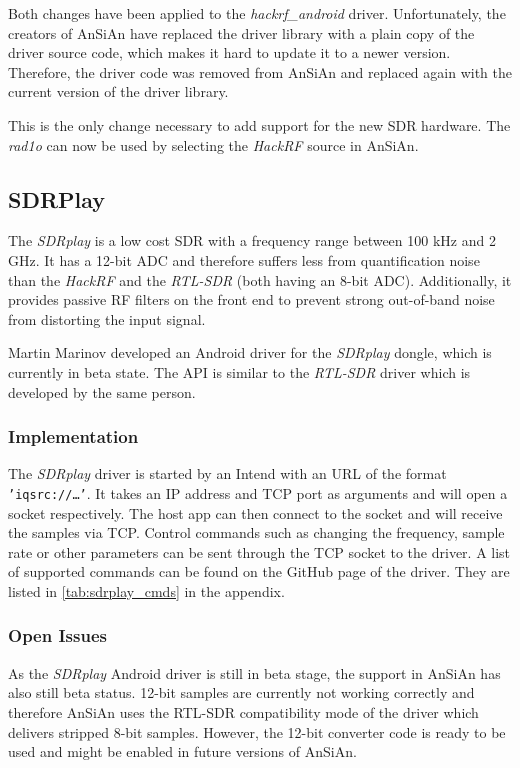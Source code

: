 Both changes have been applied to the \emph{hackrf\_android} driver. Unfortunately, the
creators of \ac{AnSiAn} have replaced the driver library with a plain copy of the driver
source code, which makes it hard to update it to a newer version. Therefore, the
driver code was removed from \ac{AnSiAn} and replaced again with the current version
of the driver library.

This is the only change necessary to add support for the new \ac{SDR} hardware. 
The \emph{rad1o} can now be used by selecting the \emph{HackRF} source in \ac{AnSiAn}.


\subsection{SDRPlay}

The \emph{SDRplay} is a low cost \ac{SDR} with a frequency range between 100 kHz and
2 GHz. It has a 12-bit \ac{ADC} and therefore suffers less from quantification noise
than the \emph{HackRF} and the \emph{RTL-SDR} (both having an 8-bit \ac{ADC}).
Additionally, it provides passive \ac{RF} filters on the front end to prevent strong
out-of-band noise from distorting the input signal.

Martin Marinov developed an Android driver for the \emph{SDRplay} dongle, which
is currently in beta state. The API is similar to the \emph{RTL-SDR} driver which is
developed by the same person.

\subsubsection{Implementation}

The \emph{SDRplay} driver is started by an Intend with an URL of the format
\texttt{'iqsrc://\ldots'}. It takes an IP address and TCP port as arguments and
will open a socket respectively. The host app can then connect to the socket and
will receive the samples via TCP. Control commands such as changing the
frequency, sample rate or other parameters can be sent through the TCP socket
to the driver. A list of supported commands can be found on the GitHub page
of the driver. They are listed in \autoref{tab:sdrplay_cmds} in the appendix.


\subsubsection{Open Issues}

As the \emph{SDRplay} Android driver is still in beta stage, the support in AnSiAn has
also still beta status. 12-bit samples are currently not working correctly and
therefore \ac{AnSiAn} uses the RTL-SDR compatibility mode of the driver which
delivers stripped 8-bit samples. However, the 12-bit converter code is ready to
be used and might be enabled in future versions of \ac{AnSiAn}.


